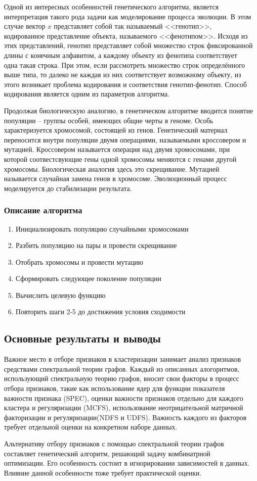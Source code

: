 Одной из интересных особенностей генетического алгоритма, является интерпретация такого рода задачи как моделирование процесса эволюции. В этом случае вектор $x$ представляет собой так называемый <<генотип>>, кодированное представление объекта, называемого <<фенотипом>>. Исходя из этих представлений, генотип представляет собой множество строк фиксированной длины с конечным алфавитом, а каждому объекту из фенотипа соответствует одна такая строка. При этом, если рассмотреть множество строк определённого выше типа, то далеко не каждая из них соответствует возможному объекту, из этого возникает проблема кодирования и соответствия генотип-фенотип. Способ кодирования является одним из параметров алгоритма\cite{gendreau2010handbook}.

Продолжая биологическую аналогию, в генетическом алгоритме вводится понятие популяции -- группы особей, имеющих общие черты в геноме. Особь характеризуется хромосомой, состоящей из генов. Генетический материал переносится внутри популяции двумя операциями, называемыми кроссовером и мутацией. Кроссовером называется операция над двумя хромосомами, при которой соотвестсвующие гены одной хромосомы меняются с генами другой хромосомы. Биологическая аналогия здесь это скрещивание. Мутацией называется случайная замена генов в хромосоме. Эволюционный процесс моделируется до стабилизации результата.
\subsubsection{Описание алгоритма}
\begin{enumerate}
	\item Инициализировать популяцию случайными хромосомами
	\item Разбить популяцию на пары и провести скрещивание
	\item Отобрать хромосомы и провести мутацию
	\item Сформировать следующее поколение популяции
	\item Вычислить целевую функцию
	\item Повторить шаги 2-5 до достижения условия сходимости
\end{enumerate}
\subsection{Основные результаты и выводы}
Важное место в отборе признаков в кластеризации занимает анализ признаков средствами спектральной теории графов. Каждый из описанных алогоритмов, использующий спектральную теорию графов, вносит свои факторы в процесс отбора признаков, такие как использование ядер для функции показателя важности признака (SPEC), оценки важности признаков отдельно для каждого кластера и регуляризации (MCFS), использование неотрицательной матричной факторизации и регуляризации(NDFS и UDFS). Важность каждого из факторов требует отдельной оценки на конкретном наборе данных.

Альтернативу отбору признаков с помощью спектральной теории графов составляет генетический алгоритм, решающий задачу комбинатрной оптимизации. Его особенность состоит в игнорировании зависимостей в данных. Влияние данной особенности тоже требует практической оценки.
